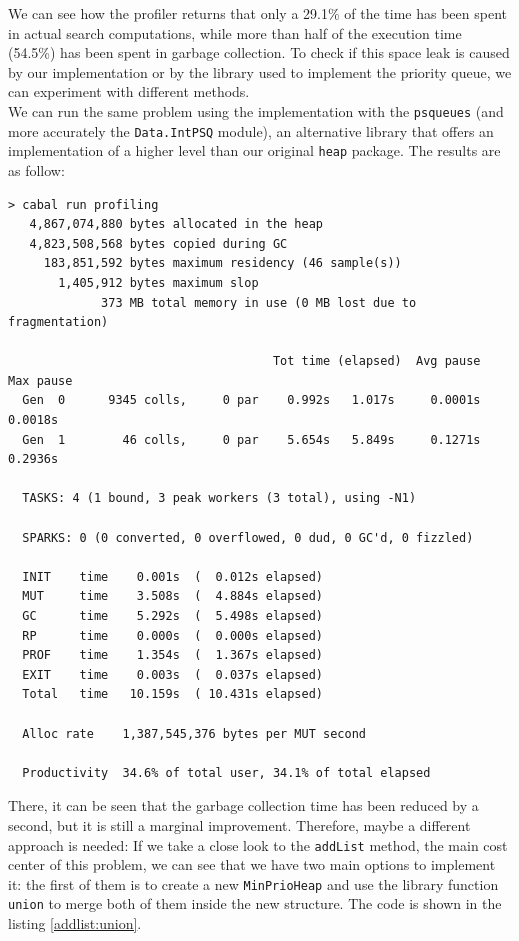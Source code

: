 We can see how the profiler returns that only a 29.1\% of the time has been
spent in actual search computations, while more than half of the execution time
(54.5\%) has been spent in garbage collection. To check if this space leak is
caused by our implementation or by the library used to implement the priority
queue, we can experiment with different methods.\\

We can run the same problem using the implementation with the \texttt{psqueues}
(and more accurately the \texttt{Data.IntPSQ} module), an alternative library
that offers an implementation of a higher level than our original \texttt{heap}
package. The results are as follow:\\


\begin{lstlisting}
> cabal run profiling
   4,867,074,880 bytes allocated in the heap
   4,823,508,568 bytes copied during GC
     183,851,592 bytes maximum residency (46 sample(s))
       1,405,912 bytes maximum slop
             373 MB total memory in use (0 MB lost due to fragmentation)

                                     Tot time (elapsed)  Avg pause  Max pause
  Gen  0      9345 colls,     0 par    0.992s   1.017s     0.0001s    0.0018s
  Gen  1        46 colls,     0 par    5.654s   5.849s     0.1271s    0.2936s

  TASKS: 4 (1 bound, 3 peak workers (3 total), using -N1)

  SPARKS: 0 (0 converted, 0 overflowed, 0 dud, 0 GC'd, 0 fizzled)

  INIT    time    0.001s  (  0.012s elapsed)
  MUT     time    3.508s  (  4.884s elapsed)
  GC      time    5.292s  (  5.498s elapsed)
  RP      time    0.000s  (  0.000s elapsed)
  PROF    time    1.354s  (  1.367s elapsed)
  EXIT    time    0.003s  (  0.037s elapsed)
  Total   time   10.159s  ( 10.431s elapsed)

  Alloc rate    1,387,545,376 bytes per MUT second

  Productivity  34.6% of total user, 34.1% of total elapsed
\end{lstlisting}


There, it can be seen that the garbage collection time has been reduced by a
second, but it is still a marginal improvement. Therefore, maybe a different
approach is needed: If we take a close look to the \texttt{addList} method, the
main cost center of this problem, we can see that we have two main options to
implement it: the first of them is to create a new \texttt{MinPrioHeap} and use
the library function \texttt{union} to merge both of them inside the new
structure. The code is shown in the listing \ref{addlist:union}.\\

